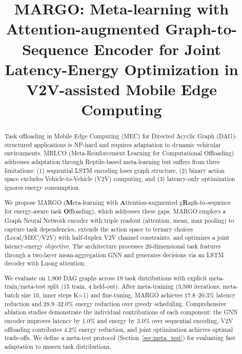 \documentclass[journal,twoside]{IEEEtran}
\newcommand{\method}{\textsc{MARGO}}
\begin{document}
\title{MARGO: Meta-learning with Attention-augmented Graph-to-Sequence Encoder for Joint Latency-Energy Optimization in V2V-assisted Mobile Edge Computing}

\author{
    }

    \maketitle

    \begin{abstract}
Task offloading in Mobile Edge Computing (MEC) for Directed Acyclic Graph (DAG)-structured applications is NP-hard and requires adaptation to dynamic vehicular environments. MRLCO (Meta-Reinforcement Learning for Computational Offloading) addresses adaptation through Reptile-based meta-learning but suffers from three limitations: (1) sequential LSTM encoding loses graph structure, (2) binary action space excludes Vehicle-to-Vehicle (V2V) computing, and (3) latency-only optimization ignores energy consumption.

We propose \method{} (\textbf{M}eta-learning with \textbf{A}ttention-augmented g\textbf{R}aph-to-sequence for energy-aware task \textbf{O}ffloading), which addresses these gaps. \method{} employs a Graph Neural Network encoder with triple readout (attention, mean, max pooling) to capture task dependencies, extends the action space to ternary choices (Local/MEC/V2V) with half-duplex V2V channel constraints, and optimizes a joint latency-energy objective. The architecture processes 20-dimensional task features through a two-layer mean-aggregation GNN and generates decisions via an LSTM decoder with Luong attention.

We evaluate on 1,900 DAG graphs across 19 task distributions with explicit meta-train/meta-test split (15 train, 4 held-out). After meta-training (3,500 iterations, meta-batch size 10, inner steps K=1) and fine-tuning, \method{} achieves 17.8--20.3\% latency reduction and 28.9--32.0\% energy reduction over greedy scheduling. Comprehensive ablation studies demonstrate the individual contributions of each component: the GNN encoder improves latency by 1.0\% and energy by 3.0\% over sequential encoding, V2V offloading contributes 4.2\% energy reduction, and joint optimization achieves optimal trade-offs. We define a meta-test protocol (Section~\ref{sec:meta_test}) for evaluating fast adaptation to unseen task distributions.
    \end{abstract}
\end{document}
